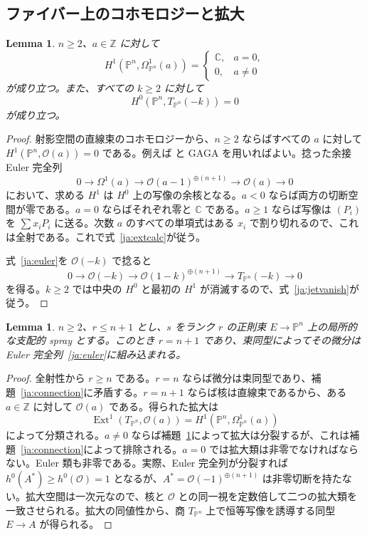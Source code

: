 \documentclass[12pt]{amsart}
\newtheorem{lem}[thm]{Lemma}
\theoremstyle{definition}
\theoremstyle{remark}
\numberwithin{equation}{section}
\newcommand{\cO}{\mathcal{O}}
\newcommand{\Z}{\mathbb{Z}}
\newcommand{\C}{\mathbb{C}}
\newcommand{\mP}{\mathbb{P}}
\DeclareMathOperator{\Ext}{Ext}
\begin{document}
\subsection{ファイバー上のコホモロジーと拡大}
\begin{lem}\label{ja:cohom}
$n\geq2$、$a\in\Z$ に対して
\begin{equation}\label{ja:extcalc}
H^1(\mP^n,\Omega^1_{\mP^n}(a))=
\begin{cases}\C,&a=0,\\0,&a\ne0\end{cases}
\end{equation}
が成り立つ。また、すべての $k\geq2$ に対して
\begin{equation}\label{ja:jetvanish}
H^0(\mP^n,T_{\mP^n}(-k))=0
\end{equation}
が成り立つ。
\end{lem}
\begin{proof}
射影空間の直線束のコホモロジーから、$n\geq2$ ならばすべての $a$ に対して $H^1(\mP^n,\cO(a))=0$ である。例えば \cite[Lemma~30.8.1]{ja:Stacks} と GAGA \cite{ja:Serre} を用いればよい。捻った余接 Euler 完全列
\[
0\longrightarrow\Omega^1(a)\longrightarrow
\cO(a-1)^{\oplus(n+1)}\longrightarrow\cO(a)\longrightarrow0
\]
において、求める $H^1$ は $H^0$ 上の写像の余核となる。$a<0$ ならば両方の切断空間が零である。$a=0$ ならばそれぞれ零と $\C$ である。$a\geq1$ ならば写像は $(P_i)$ を $\sum x_iP_i$ に送る。次数 $a$ のすべての単項式はある $x_i$ で割り切れるので、これは全射である。これで式~\eqref{ja:extcalc}が従う。

式~\eqref{ja:euler}を $\cO(-k)$ で捻ると
\[
0\longrightarrow\cO(-k)\longrightarrow
\cO(1-k)^{\oplus(n+1)}\longrightarrow T_{\mP^n}(-k)\longrightarrow0
\]
を得る。$k\geq2$ では中央の $H^0$ と最初の $H^1$ が消滅するので、式~\eqref{ja:jetvanish}が従う。
\end{proof}

\begin{lem}\label{ja:fibreclass}
$n\geq2$、$r\leq n+1$ とし、$s$ をランク $r$ の正則束 $E\to\mP^n$ 上の局所的な支配的 spray とする。このとき $r=n+1$ であり、束同型によってその微分は Euler 完全列~\eqref{ja:euler}に組み込まれる。
\end{lem}
\begin{proof}
全射性から $r\geq n$ である。$r=n$ ならば微分は束同型であり、補題~\ref{ja:connection}に矛盾する。$r=n+1$ ならば核は直線束であるから、ある $a\in\Z$ に対して $\cO(a)$ である。得られた拡大は
\[
\Ext^1(T_{\mP^n},\cO(a))
=H^1(\mP^n,\Omega^1_{\mP^n}(a))
\]
によって分類される。$a\ne0$ ならば補題~\ref{ja:cohom}によって拡大は分裂するが、これは補題~\ref{ja:connection}によって排除される。$a=0$ では拡大類は非零でなければならない。Euler 類も非零である。実際、Euler 完全列が分裂すれば $h^0(A^*)\geq h^0(\cO)=1$ となるが、$A^*=\cO(-1)^{\oplus(n+1)}$ は非零切断を持たない。拡大空間は一次元なので、核と $\cO$ との同一視を定数倍して二つの拡大類を一致させられる。拡大の同値性から、商 $T_{\mP^n}$ 上で恒等写像を誘導する同型 $E\to A$ が得られる。
\end{proof}
\end{document}
